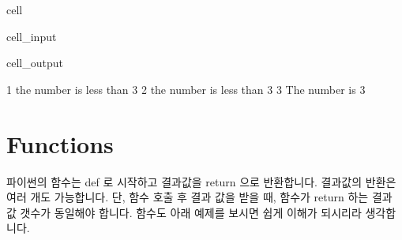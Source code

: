 \documentclass[letterpaper,10pt,english]{jupyterBook}
\begin{document}
\begin{sphinxuseclass}{cell}\begin{sphinxVerbatimInput}

\begin{sphinxuseclass}{cell_input}
\begin{sphinxVerbatim}[commandchars=\\\{\}]
   
       
         
       
          
         
\end{sphinxVerbatim}

\end{sphinxuseclass}\end{sphinxVerbatimInput}
\begin{sphinxVerbatimOutput}

\begin{sphinxuseclass}{cell_output}
\begin{sphinxVerbatim}[commandchars=\\\{\}]
1 the number is less than 3
2 the number is less than 3
3 The number is 3
\end{sphinxVerbatim}

\end{sphinxuseclass}\end{sphinxVerbatimOutput}

\end{sphinxuseclass}

\part{Functions}
\label{\detokenize{chapter2/2.1.5_Python_Basics:functions}}\label{\detokenize{chapter2/2.1.5_Python_Basics::doc}}
\sphinxAtStartPar
파이썬의 함수는 def 로 시작하고 결과값을 return 으로 반환합니다. 결과값의 반환은 여러 개도 가능합니다. 단, 함수 호출 후 결과 값을 받을 때, 함수가 return 하는 결과 값 갯수가 동일해야 합니다. 함수도 아래 예제를 보시면 쉽게 이해가 되시리라 생각합니다.
\end{document}
